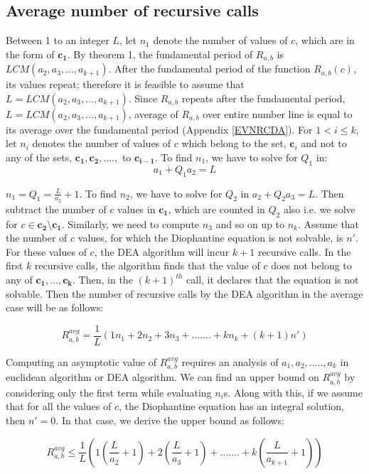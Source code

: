 \documentclass[pdflatex,sn-mathphys-num]{sn-jnl}%
\theoremstyle{thmstyleone}%
\theoremstyle{thmstyletwo}%
\theoremstyle{thmstylethree}%
\begin{document}
\subsection{Average number of recursive calls}
 Between 1 to an integer $L$, let $n_1$ denote the number of values of $c$, which are in the form of $\mathbf{c_1}$. By theorem 1, the fundamental period of $R_{a,b}$ is $LCM(a_2,a_3,\ldots,a_{k+1})$. After the fundamental period of the function $R_{a,b}(c)$, its values repeat; therefore it is feasible to assume that $L=LCM(a_2,a_3,\ldots,a_{k+1})$. Since $R_{a,b}$ repeats after the fundamental period, $L=LCM(a_2,a_3,\ldots,a_{k+1})$, average of $R_{a,b}$ over entire number line is equal to its average over the fundamental period (Appendix \ref{EVNRCDA}). For $1<i\le k$, let $n_i$ denotes the number of values of $c$ which belong to the set, $\mathbf{c}_i$ and not to any of the sets, $\mathbf{c_1},\mathbf{c_2},....,$ to $\mathbf{c_{i-1}}$. 
To find $n_1$, we have to solve for $Q_1$ in: 
$$a_1+Q_1a_2=L$$

$n_1=Q_1=\frac{L}{a_2}+1$. 
To find $n_2$, we have to solve for $Q_2$ in
$a_2+Q_2a_3=L$. Then subtract the number of $c$ values in $\mathbf{c_1}$, which are counted in $Q_2$ also i.e. we solve for $c \in \mathbf{c_2}\setminus \mathbf{c_1}$. Similarly, we need to compute $n_3$ and so on up to $n_k$. Assume that the number of $c$ values, for which the Diophantine equation is not solvable, is $n'$. For these values of $c$, the DEA algorithm will incur $k+1$ recursive calls. In the first $k$ recursive calls, the algorithm finds that the value of $c$ does not belong to any of $\mathbf{c_1},...,\mathbf{c_k}$. Then, in the $(k+1)^{th}$ call, it declares that the equation is not solvable.
Then the number of recursive calls by the DEA algorithm in the average case will be as follows:

\begin{equation} \label{avgeq1}
    R_{a,b}^{avg}=\frac{1}{L}(1n_1+2n_2+3n_3+.......+kn_k+(k+1)n')
\end{equation}

Computing an asymptotic value of $R_{a,b}^{avg}$ requires an analysis of 
$a_1,a_2,.....,a_k$ in euclidean algorithm or DEA algorithm. 
We can find an upper bound on $R_{a,b}^{avg}$ by considering only the first term while evaluating $n_i$s. Along with this, if we assume that for all the values of $c$, the Diophantine equation has an integral solution, then $n'=0$.
In that case, we derive the upper bound as follows:

\begin{equation} \label{bound1}
    R_{a,b}^{avg}\le \frac{1}{L}\left(1\left(\frac{L}{a_2}+1\right)+2\left(\frac{L}{a_3}+1\right)+.......+k\left(\frac{L}{a_{k+1}}+1\right)\right)
\end{equation} 
\end{document}
